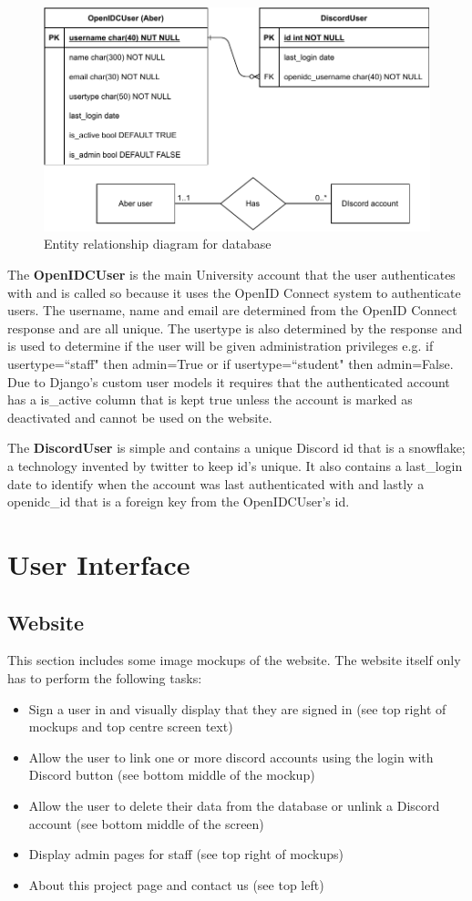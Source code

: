 \begin{figure}[H]
	\centering
	\includegraphics[width=0.8\linewidth]{Figures/database-er-0}
	\caption{Entity relationship diagram for database}
	\label{fig:database-er}
\end{figure}
The \textbf{OpenIDCUser} is the main University account that the user authenticates with and is called so because it uses the OpenID Connect \cite{OpenID} system to authenticate users. The username, name and email are determined from the OpenID Connect response and are all unique. The usertype is also determined by the response and is used to determine if the user will be given administration privileges e.g. if usertype=``staff" then admin=True or if usertype=``student" then admin=False. Due to Django's custom user models it requires that the authenticated account has a is\_active column that is kept true unless the account is marked as deactivated and cannot be used on the website.

The \textbf{DiscordUser} is simple and contains a unique Discord id that is a snowflake; a technology invented by twitter to keep id's unique. It also contains a last\_login date to identify when the account was last authenticated with and lastly a openidc\_id that is a foreign key from the OpenIDCUser's id.

\section{User Interface}\label{sec2:ui}

\subsection{Website}
This section includes some image mockups of the website. The website itself only has to perform the following tasks: 

\begin{itemize}
	\item Sign a user in and visually display that they are signed in (see top right of mockups and top centre screen text)
	\item Allow the user to link one or more discord accounts using the login with Discord button (see bottom middle of the mockup)
	\item Allow the user to delete their data from the database or unlink a Discord account (see bottom middle of the screen)
	\item Display admin pages for staff (see top right of mockups)
	\item About this project page and contact us (see top left)
\end{itemize}

